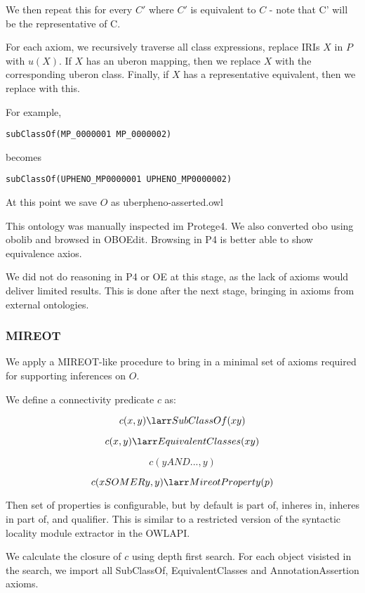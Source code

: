 We then repeat this for every $C'$ where $C'$ is equivalent to $C$ -
note that C' will be the representative of C.

For each axiom, we recursively traverse all class expressions, replace
IRIs $X$ in $P$ with $u(X)$. If $X$ has an uberon mapping,
then we replace $X$ with the corresponding uberon class. Finally,
if $X$ has a representative equivalent, then we replace with this.

For example,

\begin{verbatim}
subClassOf(MP_0000001 MP_0000002)
\end{verbatim}

becomes

\begin{verbatim}
subClassOf(UPHENO_MP0000001 UPHENO_MP0000002)
\end{verbatim}

At this point we save $O$ as uberpheno-asserted.owl

This ontology was manually inspected im Protege4. We also converted
obo using obolib and browsed in OBOEdit. Browsing in P4 is better
able to show equivalence axios.

We did not do reasoning in P4 or OE at this stage, as the lack of
axioms would deliver limited results. This is done after the next
stage, bringing in axioms from external ontologies.

\subsubsection{MIREOT}

We apply a MIREOT-like procedure to bring in a minimal set of axioms
required for supporting inferences on $O$.

We define a connectivity predicate $c$ as:

$$
c(x,y) \larr SubClassOf(x y)
$$

$$
c(x,y) \larr EquivalentClasses(x y)
$$

$$
c(y AND ...,y)
$$

$$
c(x SOME R y,y) \larr MireotProperty(p)
$$

Then set of properties is configurable, but by default is part of,
inheres in, inheres in part of, and qualifier. This is similar to a
restricted version of the syntactic locality module extractor in the
OWLAPI.

We calculate the closure of $c$ using depth first search. For each
object visisted in the search, we import all SubClassOf,
EquivalentClasses and AnnotationAssertion axioms.

